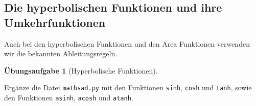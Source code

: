 \documentclass[
  a4paper,
  DIV=11]{scrreprt}
\theoremstyle{definition}
\newtheorem{exercise}{Übungsaufgabe}[chapter]
\theoremstyle{definition}
\theoremstyle{remark}
\begin{document}
\hypertarget{die-hyperbolischen-funktionen-und-ihre-umkehrfunktionen}{%
\subsection{Die hyperbolischen Funktionen und ihre
Umkehrfunktionen}\label{die-hyperbolischen-funktionen-und-ihre-umkehrfunktionen}}

Auch bei den hyperbolischen Funktionen und den Area Funktionen verwenden
wir die bekannten Ableitungsregeln.

\begin{exercise}[Hyperbolische
Funktionen]\protect\hypertarget{exr-implementHyp}{}\label{exr-implementHyp}

Ergänze die Datei \texttt{mathsad.py} mit den Funktionen \texttt{sinh},
\texttt{cosh} und \texttt{tanh}, sowie den Funktionen \texttt{asinh},
\texttt{acosh} und \texttt{atanh}.

\end{exercise}
\end{document}
